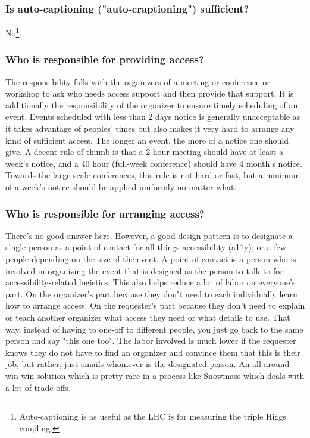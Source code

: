\documentclass{article}
\begin{document}
  \subsubsection{Is auto-captioning ("auto-craptioning") sufficient?}

  No\footnote{Auto-captioning is as useful as the LHC is for measuring the triple Higgs coupling.}.~\cite{AudioAccessibility, TheAtlantic, DCMP, ReelWords, A11yNYC, Wired, AngryDeafPeople}

  \subsubsection{Who is responsible for providing access?}

  The responsibility falls with the organizers of a meeting or conference or workshop to ask who needs access support and then provide that support. It is additionally the responsibility of the organizer to ensure timely scheduling of an event. Events scheduled with less than 2 days notice is generally unacceptable as it takes advantage of peoples' times but also makes it very hard to arrange any kind of sufficient access. The longer an event, the more of a notice one should give. A decent rule of thumb is that a 2 hour meeting should have at least a week's notice, and a 40 hour (full-week conference) should have 4 month's notice. Towards the large-scale conferences, this rule is not hard or fast, but a minimum of a week's notice should be applied uniformly no matter what.

  \subsubsection{Who is responsible for arranging access?}

  There's no good answer here. However, a good design pattern is to designate a single person as a point of contact for all things accessibility (a11y); or a few people depending on the size of the event. A point of contact is a person who is involved in organizing the event that is designed as the person to talk to for accessibility-related logistics. This also helps reduce a lot of labor on everyone's part. On the organizer's part because they don't need to each individually learn how to arrange access. On the requester's part because they don't need to explain or teach another organizer what access they need or what details to use. That way, instead of having to one-off to different people, you just go back to the same person and say "this one too". The labor involved is much lower if the requester knows they do not have to find an organizer and convince them that this is their job, but rather, just emails whomever is the designated person. An all-around win-win solution which is pretty rare in a process like Snowmass which deals with a lot of trade-offs.
\end{document}
